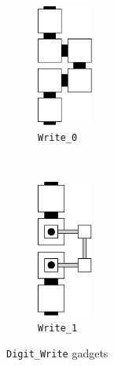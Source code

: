 \begin{figure}[H]
    \centering
    \begin{subfigure}[t]{0.2\textwidth}
        \centering
        \includegraphics[width=0.2\textwidth]{write/write_0}
        \caption{\label{fig:write_0} {\tt Write\_0}}
    \end{subfigure}%
    ~
    \begin{subfigure}[t]{0.2\textwidth}
        \centering
        \includegraphics[width=0.2\textwidth]{write/write_1}
        \caption{\label{fig:write_1} {\tt Write\_1}}
    \end{subfigure}%
    \caption{\label{fig:digit_write} {\tt Digit\_Write} gadgets}
\end{figure}